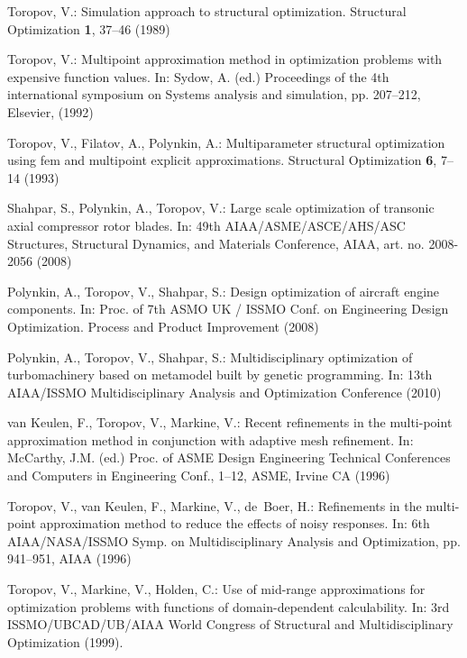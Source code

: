 \documentclass[runningheads,a4paper]{llncs}
\begin{document}
\begin{thebibliography}{10}

Toropov, V.:
\newblock Simulation approach to structural optimization.
\newblock Structural Optimization \textbf{1}, 37--46 (1989)

Toropov, V.:
\newblock Multipoint approximation method in optimization problems with expensive function values.
\newblock In: Sydow, A. (ed.) Proceedings of the 4th international symposium on Systems analysis and simulation, 
pp. 207--212, Elsevier,  (1992)

Toropov, V., Filatov, A., Polynkin, A.:
\newblock Multiparameter structural optimization using fem and multipoint explicit approximations.
\newblock Structural Optimization \textbf{6}, 7--14 (1993)

Shahpar, S., Polynkin, A., Toropov, V.:
\newblock Large scale optimization of transonic axial compressor rotor blades.
\newblock In:  49th AIAA/ASME/ASCE/AHS/ASC Structures, Structural Dynamics, and Materials Conference, AIAA, art. no. 2008-2056
 (2008)

Polynkin, A., Toropov, V., Shahpar, S.:
\newblock Design optimization of aircraft engine components.
\newblock In: Proc. of 7th ASMO UK / ISSMO Conf. on Engineering Design Optimization. Process and Product Improvement (2008)

Polynkin, A., Toropov, V., Shahpar, S.:
\newblock Multidisciplinary optimization of turbomachinery based on metamodel built by genetic programming.
\newblock In: 13th AIAA/ISSMO Multidisciplinary Analysis and Optimization Conference (2010)

van Keulen, F., Toropov, V., Markine, V.:
\newblock Recent refinements in the multi-point approximation method in conjunction with adaptive mesh refinement.
\newblock In: McCarthy, J.M. (ed.) Proc. of ASME Design Engineering Technical Conferences and Computers
  in Engineering Conf., 1--12, ASME, Irvine CA (1996)

Toropov, V., van Keulen, F., Markine, V., de~Boer, H.:
\newblock Refinements in the multi-point approximation method to reduce the effects of noisy responses.
\newblock In: 6th AIAA/NASA/ISSMO Symp. on Multidisciplinary Analysis and Optimization,  pp. 941--951, AIAA (1996)

Toropov, V., Markine, V., Holden, C.:
\newblock Use of mid-range approximations for optimization problems with functions of domain-dependent calculability.
\newblock In: 3rd ISSMO/UBCAD/UB/AIAA World Congress of Structural and Multidisciplinary Optimization (1999).


\end{thebibliography}
\end{document}
